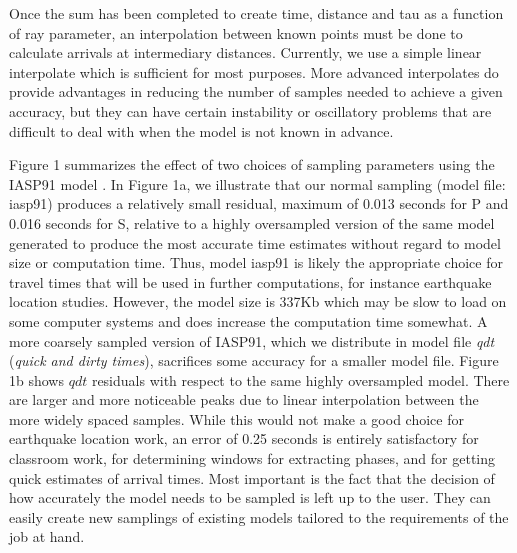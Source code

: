 Once the sum has been completed to create time, distance and tau as a function
of ray parameter, an interpolation between known points must be done to 
calculate arrivals at intermediary distances.
Currently, we use a simple linear interpolate which is sufficient for most purposes. 
More advanced interpolates do provide advantages in reducing the
number of samples needed to achieve a given accuracy, but they can have certain
instability or oscillatory problems that are difficult to deal with when the model
is not known in advance.

Figure 1 summarizes the effect of two choices of sampling parameters using 
the IASP91 model \cite{iasp}.
In Figure 1a, we illustrate that our normal sampling (model file: iasp91) produces a relatively small 
residual, maximum of 0.013 seconds for P and 0.016 seconds for S, relative to 
a highly oversampled version of the same model generated to produce the most accurate time
estimates without regard to model size or computation time.
Thus, model iasp91 is likely the appropriate choice for travel times that will be
used in further computations, for instance earthquake location studies. 
However, the model size is 337Kb which may be slow to load on some computer systems and does
increase the computation time somewhat.  
A more coarsely sampled version of IASP91, which we distribute in model file
\textit{qdt} (\textit{quick and dirty times}), sacrifices some accuracy
for a smaller model file. 
Figure 1b shows $qdt$ residuals with respect to the same highly oversampled model. 
There are larger and more noticeable peaks due to linear interpolation between the more widely 
spaced samples. 
While this would not make a good choice for earthquake location work, an error of 0.25 seconds is 
entirely satisfactory for classroom work, for determining windows for extracting phases, and
for getting quick estimates of arrival times. 
Most important is the fact that the decision of how accurately
the model needs to be sampled is left up to the user. 
They can easily create new samplings of existing models tailored to the requirements of the 
job at hand.

